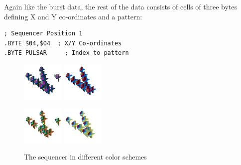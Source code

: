 Again like the burst data, the rest of the data consists of cells of three bytes defining X and Y co-ordinates
and a pattern:
\begin{lstlisting}[escapechar=\%]
; Sequencer Position 1
.BYTE $04,$04  ; X/Y Co-ordinates
.BYTE PULSAR     ; Index to pattern    
\end{lstlisting}
\vfill
\begin{figure}[H]
    \centering
    \begin{adjustbox}{width=10cm,center}
      \includegraphics[width=2cm]{src/listing_commentary/sequencer/pattern1-0-45.png}%
      \includegraphics[width=2cm]{src/listing_commentary/sequencer/pattern1-1-45.png}%
    \end{adjustbox}
    \begin{adjustbox}{width=10cm,center}
      \includegraphics[width=2cm]{src/listing_commentary/sequencer/pattern1-3-45.png}%
      \includegraphics[width=2cm]{src/listing_commentary/sequencer/pattern1-4-45.png}%
    \end{adjustbox}
    \caption{The sequencer in different color schemes}
\end{figure}


